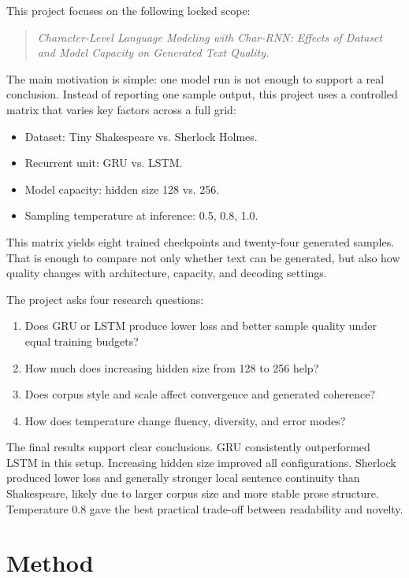 \documentclass[10pt,twocolumn,letterpaper]{article}
\begin{document}
This project focuses on the following locked scope:
\begin{quote}
\textit{Character-Level Language Modeling with Char-RNN: Effects of Dataset and Model Capacity on Generated Text Quality.}
\end{quote}

The main motivation is simple: one model run is not enough to support a real conclusion. Instead of reporting one sample output, this project uses a controlled matrix that varies key factors across a full grid:
\begin{itemize}
\item Dataset: Tiny Shakespeare vs. Sherlock Holmes.
\item Recurrent unit: GRU vs. LSTM.
\item Model capacity: hidden size 128 vs. 256.
\item Sampling temperature at inference: 0.5, 0.8, 1.0.
\end{itemize}

This matrix yields eight trained checkpoints and twenty-four generated samples. That is enough to compare not only whether text can be generated, but also how quality changes with architecture, capacity, and decoding settings.

The project asks four research questions:
\begin{enumerate}
\item Does GRU or LSTM produce lower loss and better sample quality under equal training budgets?
\item How much does increasing hidden size from 128 to 256 help?
\item Does corpus style and scale affect convergence and generated coherence?
\item How does temperature change fluency, diversity, and error modes?
\end{enumerate}

The final results support clear conclusions. GRU consistently outperformed LSTM in this setup. Increasing hidden size improved all configurations. Sherlock produced lower loss and generally stronger local sentence continuity than Shakespeare, likely due to larger corpus size and more stable prose structure. Temperature 0.8 gave the best practical trade-off between readability and novelty.

\section{Method}
\end{document}
